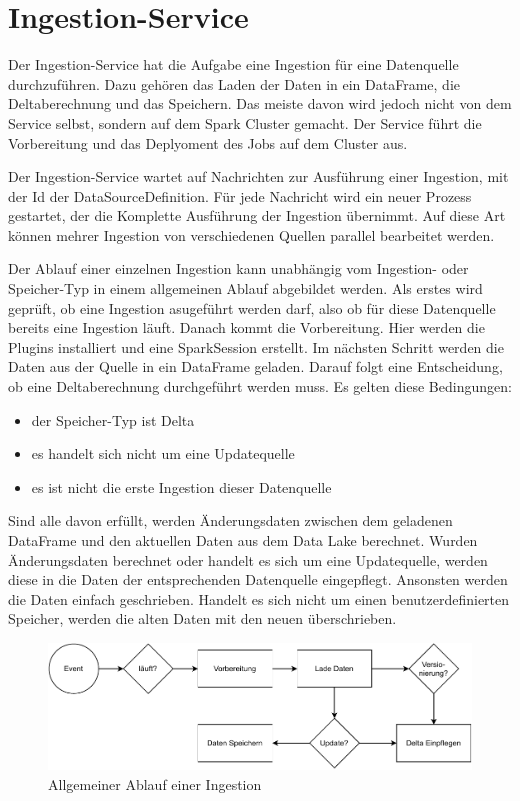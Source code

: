 \section{Ingestion-Service}

Der Ingestion-Service hat die Aufgabe eine Ingestion für eine Datenquelle durchzuführen.
Dazu gehören das Laden der Daten in ein DataFrame, die Deltaberechnung und das Speichern.
Das meiste davon wird jedoch nicht von dem Service selbst, sondern auf dem Spark Cluster gemacht.
Der Service führt die Vorbereitung und das Deplyoment des Jobs auf dem Cluster aus.

Der Ingestion-Service wartet auf Nachrichten zur Ausführung einer Ingestion, mit der Id der DataSourceDefinition.
Für jede Nachricht wird ein neuer Prozess gestartet, der die Komplette Ausführung der Ingestion übernimmt.
Auf diese Art können mehrer Ingestion von verschiedenen Quellen parallel bearbeitet werden.

Der Ablauf einer einzelnen Ingestion kann unabhängig vom Ingestion- oder Speicher-Typ in einem allgemeinen Ablauf abgebildet werden.
Als erstes wird geprüft, ob eine Ingestion asugeführt werden darf, also ob für diese Datenquelle bereits eine Ingestion läuft.
Danach kommt die Vorbereitung.
Hier werden die Plugins installiert und eine SparkSession erstellt.
Im nächsten Schritt werden die Daten aus der Quelle in ein DataFrame geladen.
Darauf folgt eine Entscheidung, ob eine Deltaberechnung durchgeführt werden muss.
Es gelten diese Bedingungen: \begin{itemize}
    \item der Speicher-Typ ist Delta
    \item es handelt sich nicht um eine Updatequelle
    \item es ist nicht die erste Ingestion dieser Datenquelle
\end{itemize}
Sind alle davon erfüllt, werden Änderungsdaten zwischen dem geladenen DataFrame und den aktuellen Daten aus dem Data Lake berechnet.
Wurden Änderungsdaten berechnet oder handelt es sich um eine Updatequelle, werden diese in die Daten der entsprechenden Datenquelle eingepflegt.
Ansonsten werden die Daten einfach geschrieben.
Handelt es sich nicht um einen benutzerdefinierten Speicher, werden die alten Daten mit den neuen überschrieben.

\begin{figure}
    \centering
    \includegraphics[width=\textwidth]{Grafiken/Entwicklung-Ingestion-Ablauf.pdf}
    \caption{Allgemeiner Ablauf einer Ingestion}
    \label{fig:ingestion-ablauf}
\end{figure}